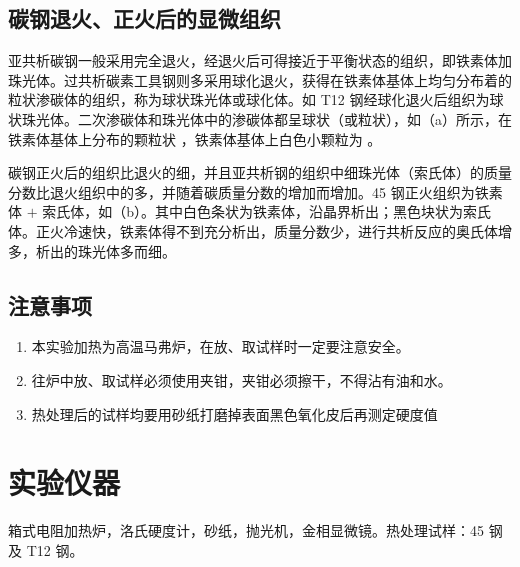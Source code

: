 \documentclass[a4paper,utf8]{article}
\begin{document}
    \subsection{碳钢退火、正火后的显微组织}
        亚共析碳钢一般采用完全退火，经退火后可得接近于平衡状态的组织，即铁素体加珠光体。过共析碳素工具钢则多采用球化退火，获得在铁素体基体上均匀分布着的粒状渗碳体的组织，称为球状珠光体或球化体。如 T12 钢经球化退火后组织为球状珠光体。二次渗碳体和珠光体中的渗碳体都呈球状（或粒状），如（a）所示，在铁素体基体上分布的颗粒状 ，铁素体基体上白色小颗粒为 。\par
        碳钢正火后的组织比退火的细，并且亚共析钢的组织中细珠光体（索氏体）的质量分数比退火组织中的多，并随着碳质量分数的增加而增加。45 钢正火组织为铁素体 $+$ 索氏体，如（b）。其中白色条状为铁素体，沿晶界析出；黑色块状为索氏体。正火冷速快，铁素体得不到充分析出，质量分数少，进行共析反应的奥氏体增多，析出的珠光体多而细。
    \subsection{注意事项}
    \begin{enumerate}
        \item 本实验加热为高温马弗炉，在放、取试样时一定要注意安全。
        \item 往炉中放、取试样必须使用夹钳，夹钳必须擦干，不得沾有油和水。
        \item 热处理后的试样均要用砂纸打磨掉表面黑色氧化皮后再测定硬度值
    \end{enumerate}
\section{实验仪器}%
    箱式电阻加热炉，洛氏硬度计，砂纸，抛光机，金相显微镜。热处理试样：45 钢及 T12 钢。
\end{document}
